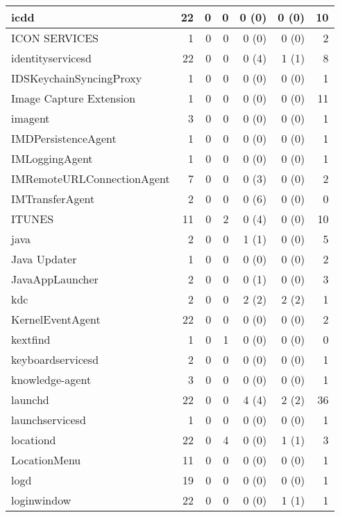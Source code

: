 \begin{adjustwidth}{-2in}{}
\begin{scriptsize}
\begin{longtable}[l]{ l | r | r | r | r | r | r }
    icdd &  22 &  0 &  0 &  0 (0) &  0 (0) & 10 \\ \hline
    ICON SERVICES &  1 &  0 &  0 &  0 (0) &  0 (0) &  2 \\ \hline
    identityservicesd & 22 &  0 &  0 &  0 (4) &  1 (1) &  8 \\ \hline
    IDSKeychainSyncingProxy &  1 &  0 &  0 &  0 (0) &  0 (0) &  1 \\ \hline
    Image Capture Extension &  1 &  0 &  0 &  0 (0) &  0 (0) & 11 \\ \hline
    imagent &  3 &  0 &  0 &  0 (0) &  0 (0) &  1 \\ \hline
    IMDPersistenceAgent &  1 &  0 &  0 &  0 (0) &  0 (0) &  1 \\ \hline
    IMLoggingAgent & 1 &  0 &  0 &  0 (0) &  0 (0) &  1 \\ \hline
    IMRemoteURLConnectionAgent & 7 &  0 &  0 &  0 (3) &  0 (0) &  2 \\ \hline
    IMTransferAgent &  2 &  0 &  0 &  0 (6) &  0 (0) &  0 \\ \hline
    ITUNES &  11 &  0 &  2 &  0 (4) &  0 (0) & 10 \\ \hline
    java & 2 &  0 &  0 &  1 (1) &  0 (0) &  5 \\ \hline
    Java Updater &  1 &  0 &  0 &  0 (0) &  0 (0) &  2 \\ \hline
    JavaAppLauncher &  2 &  0 &  0 &  0 (1) &  0 (0) &  3 \\ \hline
    kdc &  2 &  0 &  0 &  2 (2) &  2 (2) &  1 \\ \hline
    KernelEventAgent &  22 &  0 &  0 &  0 (0) &  0 (0) &  2 \\ \hline
    kextfind & 1 &  0 &  1 &  0 (0) &  0 (0) &  0 \\ \hline
    keyboardservicesd &  2 &  0 &  0 &  0 (0) &  0 (0) &  1 \\ \hline
    knowledge-agent &  3 &  0 &  0 &  0 (0) &  0 (0) &  1 \\ \hline
    launchd & 22 &  0 &  0 &  4 (4) &  2 (2) & 36 \\ \hline
    launchservicesd &  1 &  0 &  0 &  0 (0) &  0 (0) &  1 \\ \hline
    locationd & 22 &  0 &  4 &  0 (0) &  1 (1) &  3 \\ \hline
    LocationMenu &  11 &  0 &  0 &  0 (0) &  0 (0) &  1 \\ \hline
    logd &  19 &  0 &  0 &  0 (0) &  0 (0) &  1 \\ \hline
    loginwindow & 22 &  0 &  0 &  0 (0) &  1 (1) &  1 \\ \hline

\end{longtable}
\end{scriptsize}
\end{adjustwidth}
